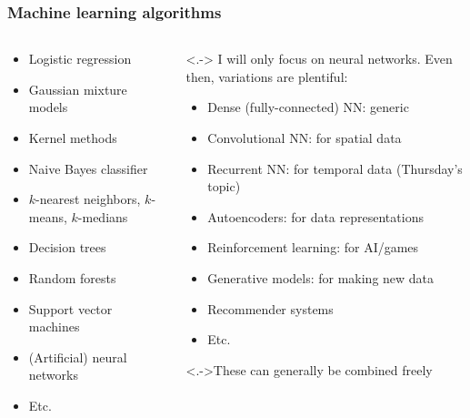 \begin{frame}
    \frametitle{Machine learning algorithms}

    \begin{columns}
        \begin{column}{0.44\textwidth}
            \begin{itemize}[<.->]
                \item Logistic regression
                \item Gaussian mixture models
                \item Kernel methods
                \item Naive Bayes classifier
                \item $k$-nearest neighbors, $k$-means, $k$-medians
                \item Decision trees
                \item Random forests
                \item Support vector machines
                \item \alert<+->{(Artificial) neural networks}
                \item Etc.
            \end{itemize}
        \end{column}

        \begin{column}{0.56\textwidth}
            \uncover<.->{%
                I will only focus on neural networks.
                Even then, variations are plentiful:
            }
            \begin{itemize}[<.->]
                \item \alert<3->{Dense (fully-connected) NN: generic}
                \item Convolutional NN: for spatial data
                \item \alert<3->{Recurrent NN: for temporal data (Thursday's topic)}
                \item Autoencoders: for data representations
                \item Reinforcement learning: for AI/games
                \item Generative models: for making new data
                \item Recommender systems
                \item Etc.
            \end{itemize}
            \uncover<.->{These can generally be combined freely}
        \end{column}
    \end{columns}
\end{frame}

